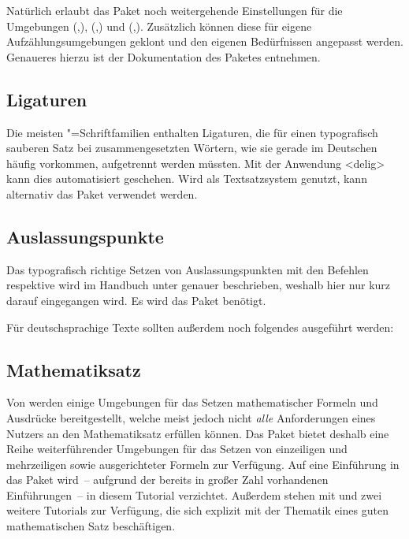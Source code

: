\documentclass[%
  english,ngerman,%
  cdgeometry=no,DIV=12,%
  cd=false,cdfont=false,cdtitle=true,%
  headings=normal,%
  automark,%
  listof=toc,%
]{tudscrartcl}
\begin{document}
Natürlich erlaubt das Paket noch weitergehende Einstellungen für die Umgebungen 
(,),
(,) und
(,). 
Zusätzlich können diese für eigene Aufzählungsumgebungen geklont und den 
eigenen Bedürfnissen angepasst werden. Genaueres hierzu ist der Dokumentation 
des Paketes  entnehmen.


\subsection{Ligaturen}
Die meisten "=Schriftfamilien enthalten Ligaturen, die für einen 
typografisch sauberen Satz bei zusammengesetzten Wörtern, wie sie gerade im 
Deutschen häufig vorkommen, aufgetrennt werden müssten. Mit der Anwendung 
<delig> kann dies automatisiert geschehen. Wird 
 als Textsatzsystem genutzt, kann alternativ das Paket 
 verwendet werden.


\subsection{Auslassungspunkte}
Das typografisch richtige Setzen von Auslassungspunkten mit den Befehlen 
 respektive  wird im Handbuch unter 
 genauer 
beschrieben, weshalb hier nur kurz darauf eingegangen wird. Es wird das Paket 
 benötigt.
%
\begin{Preamble}
\usepackage{ellipsis}
\end{Preamble}
%
Für deutschsprachige Texte sollten außerdem noch folgendes ausgeführt werden:
%
\begin{Preamble}
\let\ellipsispunctuation\relax

\end{Preamble}


\subsection{Mathematiksatz}
Von  werden einige Umgebungen für das Setzen mathematischer 
Formeln und Ausdrücke bereitgestellt, welche meist jedoch nicht \emph{alle} 
Anforderungen eines Nutzers an den Mathematiksatz erfüllen können. Das Paket
 bietet deshalb eine Reihe weiterführender Umgebungen für das 
Setzen von einzeiligen und mehrzeiligen sowie ausgerichteter Formeln zur 
Verfügung. Auf eine Einführung in das Paket wird~-- aufgrund der bereits in 
großer Zahl vorhandenen Einführungen~-- in diesem Tutorial verzichtet. Außerdem 
stehen mit  und  zwei weitere Tutorials 
zur Verfügung, die sich explizit mit der Thematik eines guten mathematischen 
Satz beschäftigen.
\end{document}
